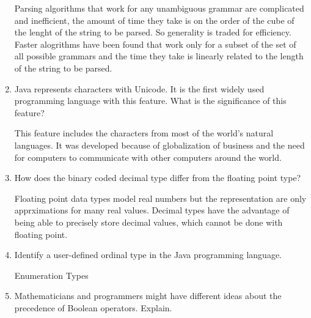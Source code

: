 \begin{enumerate}
  \begin{answer}

    Parsing algorithms that work for any unambiguous grammar are complicated and inefficient, the amount of time they take is on the order of the cube of the lenght of the string to be parsed. So generality is traded for efficiency. Faster alogrithms have been found that work only for a subset of the set of all possible grammars and the time they take is linearly related to the length of the string to be parsed.

    \end{answer}

  \item Java represents characters with Unicode. It is the first
    widely used programming language with this feature. What is the
    significance of this feature?

  \begin{answer}

    This feature includes the characters from most of the world's natural languages. It was developed because of globalization of business and the need for computers to communicate with other computers around the world.

    \end{answer}

  \item How does the binary coded decimal type differ from the
    floating point type?

  \begin{answer}

    Floating point data types model real numbers but the representation are only apprximations for many real values. Decimal types have the advantage of being able to precisely store decimal values, which cannot be done with floating point.

    \end{answer}

  \item Identify a user-defined ordinal type in the Java programming
    language.

  \begin{answer}

    Enumeration Types

    \end{answer}

  \item Mathematicians and programmers might have different ideas
    about the precedence of Boolean operators. Explain.


\end{enumerate}
